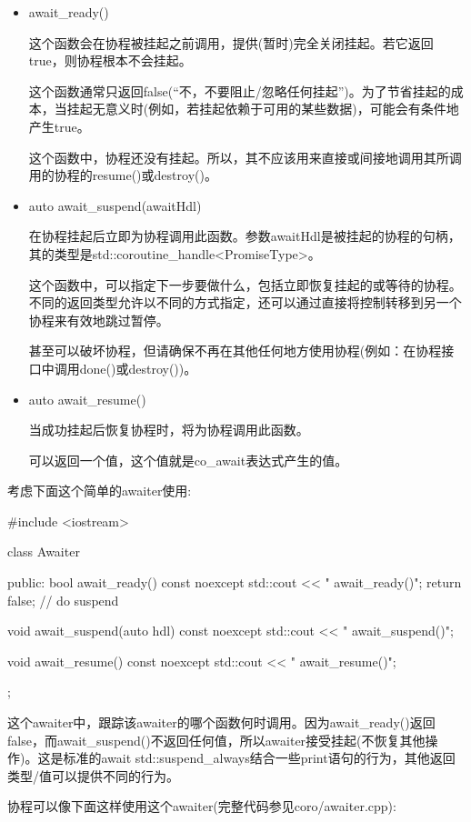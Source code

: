 \begin{itemize}
\item
await\_ready()

这个函数会在协程被挂起之前调用，提供(暂时)完全关闭挂起。若它返回true，则协程根本不会挂起。

这个函数通常只返回false(“不，不要阻止/忽略任何挂起”)。为了节省挂起的成本，当挂起无意义时(例如，若挂起依赖于可用的某些数据)，可能会有条件地产生true。

这个函数中，协程还没有挂起。所以，其不应该用来直接或间接地调用其所调用的协程的resume()或destroy()。

\item
auto await\_suspend(awaitHdl)

在协程挂起后立即为协程调用此函数。参数awaitHdl是被挂起的协程的句柄，其的类型是std::coroutine\_handle<PromiseType>。

这个函数中，可以指定下一步要做什么，包括立即恢复挂起的或等待的协程。不同的返回类型允许以不同的方式指定，还可以通过直接将控制转移到另一个协程来有效地跳过暂停。

甚至可以破坏协程，但请确保不再在其他任何地方使用协程(例如：在协程接口中调用done()或destroy())。

\item
auto await\_resume()

当成功挂起后恢复协程时，将为协程调用此函数。

可以返回一个值，这个值就是co\_await表达式产生的值。
\end{itemize}

考虑下面这个简单的awaiter使用:


\begin{cpp}
#include <iostream>

class Awaiter {
	public:
	bool await_ready() const noexcept {
		std::cout << " await_ready()\n";
		return false; // do suspend
	}

	void await_suspend(auto hdl) const noexcept {
		std::cout << " await_suspend()\n";
	}

	void await_resume() const noexcept {
		std::cout << " await_resume()\n";
	}
};
\end{cpp}

这个awaiter中，跟踪该awaiter的哪个函数何时调用。因为await\_ready()返回false，而await\_suspend()不返回任何值，所以awaiter接受挂起(不恢复其他操作)。这是标准的await std::suspend\_always{}结合一些print语句的行为，其他返回类型/值可以提供不同的行为。

协程可以像下面这样使用这个awaiter(完整代码参见coro/awaiter.cpp):

